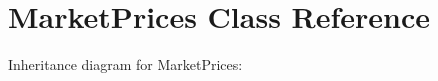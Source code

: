 \hypertarget{classMarketPrices}{}\section{Market\+Prices Class Reference}
\label{classMarketPrices}


Inheritance diagram for Market\+Prices\+:
